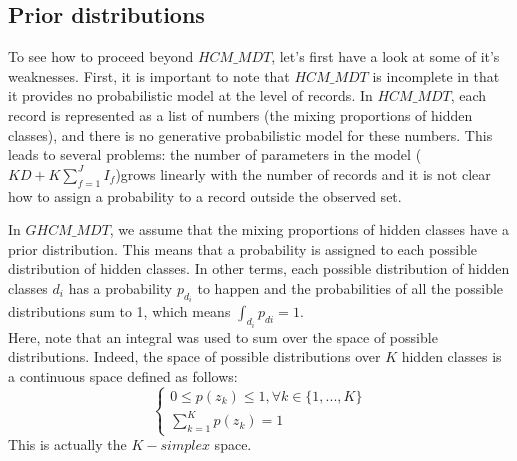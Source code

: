 \subsection{Prior distributions}
\label{3.1}
To see how to proceed beyond $HCM\_MDT$, let's first have a look at some of it's weaknesses. First, it is important to note that $HCM\_MDT$ is incomplete in that it provides no probabilistic model at the level of records. In $HCM\_MDT$, each record is represented as a list of numbers (the mixing proportions of hidden classes), and there is no generative probabilistic model for these numbers. This leads to several problems: the number of parameters in the model ($KD+K\sum_{f=1}^{J}I_{f}$)grows linearly with the number of records and it is not clear how to assign a probability to a record outside the observed set. \par

In $GHCM\_MDT$, we assume that the mixing proportions of hidden classes have a prior distribution. This means that a probability is assigned to each possible distribution of hidden classes. In other terms, each possible distribution of hidden classes $d_{i}$ has a probability $p_{d_{i}}$ to happen and the probabilities of all the possible distributions sum to 1, which means $\int_{d_{i}}p_{d{i}}=1$.
\\Here, note that an integral was used to sum over the space of possible distributions. Indeed, the space of possible distributions over $K$ hidden classes is a continuous space defined as follows:
\begin{equation}
\left\{\begin{matrix}
0\leqslant p(z_{k})\leqslant 1, \forall k \in \{1,...,K\}
\\ 
\sum_{k=1}^{K}p(z_{k})=1
\end{matrix}\right.
\end{equation}
This is actually the $K-simplex$ space. \par


